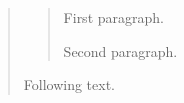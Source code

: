 \begin{quote}
  \begin{quotation}
    First paragraph.

    Second paragraph.
  \end{quotation} %
  Following text.
\end{quote} %
